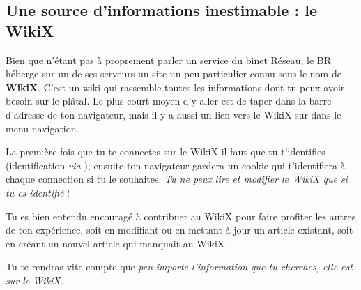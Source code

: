 
\subsection{Une source d'informations inestimable : le WikiX}
\label{WikiX}
Bien que n'\'etant pas \`a proprement parler un service du binet R\'eseau, le BR h\'eberge sur un de ses serveurs un site un peu particulier connu sous le nom de \textbf{WikiX}.
C'est un wiki qui rassemble toutes les informations dont tu peux avoir besoin sur le pl\^atal.
Le plus court moyen d'y aller est de taper  dans la barre d'adresse de ton navigateur, mais il y a aussi un lien vers le WikiX sur \fkz dans le menu navigation.

La premi\`ere fois que tu te connectes sur le WikiX il faut que tu t'identifies (identification \emph{via} );
ensuite ton navigateur gardera un cookie qui t'identifiera \`a chaque connection si tu le souhaites. \emph{Tu ne peux lire et modifier le WikiX que si tu es identifi\'e} !

Tu es bien entendu encourag\'e \`a contribuer au WikiX pour faire profiter les autres de ton exp\'erience, 
soit en modifiant ou en mettant \`a jour un article existant, soit en cr\'eant un nouvel article qui manquait au WikiX.


Tu te rendras vite compte que \emph{peu importe l'information que tu cherches, elle est sur le WikiX.}

